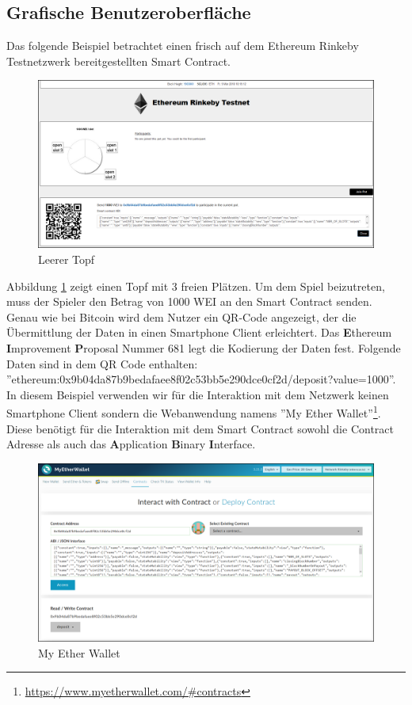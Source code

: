 \subsection{Grafische Benutzeroberfläche}

Das folgende Beispiel betrachtet einen frisch auf dem Ethereum Rinkeby Testnetzwerk bereitgestellten Smart Contract.

\begin{figure}[H]
\centering
\includegraphics[width=1\linewidth]{Figures/eth_gui/ETH_pot_empty}
\decoRule
\caption{Leerer Topf}
\label{fig:ETH_pot_empty}
\end{figure}
Abbildung \ref{fig:ETH_pot_empty} zeigt einen Topf mit 3 freien Plätzen. Um dem Spiel beizutreten, muss der Spieler den Betrag von 1000 WEI an den Smart Contract senden. Genau wie bei Bitcoin wird dem Nutzer ein QR-Code angezeigt, der die Übermittlung der Daten in einen Smartphone Client erleichtert. Das \textbf{E}thereum \textbf{I}mprovement \textbf{P}roposal Nummer 681\cite{eip681} legt die Kodierung der Daten fest.
Folgende Daten sind in dem QR Code enthalten:\\ ''ethereum:0x9b04da87b9bedafaee8f02c53bb5e290dce0cf2d/deposit?value=1000''. In diesem Beispiel verwenden wir für die Interaktion mit dem Netzwerk keinen Smartphone Client sondern die Webanwendung namens ''My Ether Wallet''\footnote{\url{https://www.myetherwallet.com/\#contracts}}. Diese benötigt für die Interaktion mit dem Smart Contract sowohl die Contract Adresse als auch das \textbf{A}pplication \textbf{B}inary \textbf{I}nterface.


\begin{figure}[H]
\centering
\includegraphics[width=1\linewidth]{Figures/eth_gui/ETH_wallet}
\decoRule
\caption{My Ether Wallet}
\label{fig:ETH_wallet}
\end{figure}

